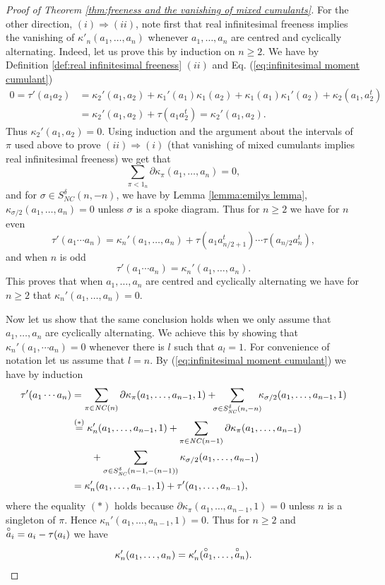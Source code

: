 \documentclass[11pt]{amsart}
\theoremstyle{definition}
\numberwithin{theorem}{section}
\newcommand{\centre}[1]{\hbox{$\mathop{#1}\limits^\circ$}}
\newcommand{\NC}{\mathit{NC}}
\begin{document}
\begin{proof}[Proof of Theorem \ref{thm:freeness and the vanishing of mixed cumulants}]
For the other direction, $(i) \Rightarrow (ii)$, note first
that real infinitesimal freeness implies the vanishing of
$\kappa'_n(a_1,\ldots, a_n)$ whenever $a_1, \ldots, a_n$ are
centred and cyclically alternating. Indeed, let us prove
this by induction on $n \geq 2$. We have by Definition
\ref{def:real infinitesimal freeness} $(ii)$ and
Eq. (\ref{eq:infinitesimal moment cumulant})
\begin{align*}
0= \tau'(a_1a_2) & = \kappa_2'(a_1, a_2) + \kappa_1'(a_1) \kappa_1(a_2) + \kappa_1(a_1) \kappa_1'(a_2) + \kappa_2(a_1, a_2^t) \\
&  \mbox{} = \kappa_2'(a_1, a_2) + \tau(a_1 a_2^t) = \kappa_2'(a_1, a_2). 
\end{align*} 
Thus $\kappa_2'(a_1, a_2) = 0$. Using induction and the
argument about the intervals of $\pi$ used above to prove
$(ii) \Rightarrow (i)$ (that vanishing of mixed cumulants
implies real infinitesimal freeness) we get that
\[
\sum_{\pi < 1_n} \partial \kappa_\pi(a_1, \dots, a_n) = 0,
\]
and for $\sigma \in S_\NC^\delta(n, -n)$, we have by Lemma
\ref{lemma:emilys lemma}, $\kappa_{\sigma/2}(a_1, \dots,
a_n) = 0$ unless $\sigma$ is a spoke diagram. Thus for $n
\geq 2$ we have for $n$ even
\[
\tau'(a_1 \cdots a_n) = \kappa_n'(a_1, \dots, a_n) + \tau(a_1a_{n/2+1}^t) \cdots \tau(a_{n/2} a_n^t),
\] 
and when $n$ is odd
\[
\tau'(a_1 \cdots a_n) = \kappa_n'(a_1, \dots, a_n).
\]
This proves that when $a_1, \dots, a_n$ are centred and
cyclically alternating we have for $n \geq 2$ that
$\kappa_n'(a_1, \dots, a_n) = 0$.

Now let us show that the same conclusion holds when we only
assume that $a_1, \dots, a_n$ are cyclically alternating. We
achieve this by showing that $\kappa_n'(a_1, \dotsm a_n) =
0$ whenever there is $l$ such that $a_l = 1$.  For
convenience of notation let us assume that $l = n$. By
(\ref{eq:infinitesimal moment cumulant}) we have by
induction
\begin{align*}
\tau'(a_1 \cdots a_n) & = 
\sum_{\pi \in \NC(n)} \partial \kappa_\pi(a_1, \dots, a_{n-1}, 1)
+ \kern-0.5em\sum_{\sigma \in S_\NC^\delta(n, -n)} \kern-0.5em
\kappa_{\sigma/2}(a_1, \dots, a_{n-1}, 1)\\
&\stackrel{(*)}{=} \kappa_n'(a_1, \dots, a_{n-1}, 1) + 
\sum_{\pi \in \NC(n-1)}\partial\kappa_\pi(a_1, \dots, a_{n-1}) \\
&\qquad\mbox{}+ 
\sum_{\sigma \in S_\NC^\delta(n-1, -(n-1))} \kappa_{\sigma/2}(a_1, \dots, a_{n-1})\\
& = \kappa_n'(a_1, \dots, a_{n-1}, 1) + \tau'(a_1, \dots, a_{n-1}),
\end{align*}
where the equality $(*)$ holds because $\partial
\kappa_\pi(a _1, \dots, a_{n-1}, 1) = 0$ unless $n$ is a
singleton of $\pi$. Hence $\kappa_n'(a_1, \dots, a_{n-1}, 1)
= 0$. Thus for $n \geq 2$ and $\centre{a}_i = a_i -
\tau(a_i)$ we have
\[
\kappa'_n(a_1, \dots, a_n)
=
\kappa'_n(\centre{a}_1, \dots, \centre{a}_n).
\]


\end{proof}
\end{document}
